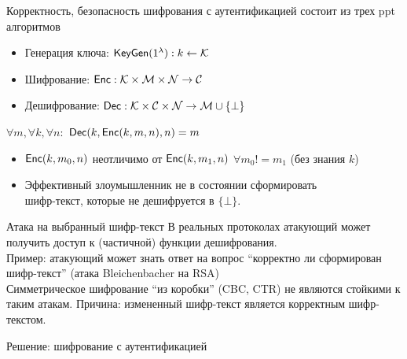 \documentclass[usenames,dvipsnames,8pt,aspectratio=169]{beamer}
\begin{document}
\begin{frame}{Корректность, безопасность шифрования с аутентификацией }
	\Large
	{\color{Orange}{Шифрование с аутентификацией (AE)}} состоит из трех ppt алгоритмов
	\begin{itemize}
		\itemsep 10pt
		\item Генерация ключа: $\textsf{KeyGen}(1^\lambda): k \leftarrow \mathcal{K}$
		\item Шифрование: $\textsf{Enc}: \mathcal{K} \times \mathcal{M} \times \mathcal{N} \rightarrow \mathcal{C}$
		\item Дешифрование:  $\textsf{Dec}: \mathcal{K} \times \mathcal{C}  \times \mathcal{N} \rightarrow \mathcal{M} \cup \{\bot\}$
	\end{itemize}
	
	\vspace{15pt}
	{\color{Orange}{Корректность:}} $\forall m, \forall k, \forall n:$ $\textsf{Dec}(k, \textsf{Enc}(k, m,n), n) = m$
	
	\vspace{15pt}
	{\color{Orange}{Безопасность (неформально):}}
	\begin{itemize}
		\itemsep 10pt
		\item $\textsf{Enc}(k, m_0, n)$ неотличимо от $\textsf{Enc}(k, m_1, n)$ $\forall m_0 != m_1$ (без знания $k$) 
		\item  Эффективный злоумышленник не в состоянии сформировать \\ шифр-текст, которые не дешифруется в $\{\bot\}$.
	\end{itemize}
	
\end{frame}

\begin{frame}{Атака на выбранный шифр-текст}
	\Large 
	В реальных протоколах атакующий может получить доступ к (частичной) функции {\color{Orange}  дешифрования}.  \\[10pt]
	
	Пример: атакующий может знать ответ на вопрос ``корректно ли сформирован шифр-текст'' (атака Bleichenbacher на RSA) \\[10pt]
	
	Симметрическое шифрование ``из коробки'' (CBC, CTR)  {\color{Orange}  не являются}  стойкими к таким атакам.  {\color{Orange} Причина:} измененный шифр-текст является  {\color{Orange}  корректным } шифр-текстом. \\[10pt]
	
	\centering
	
	{\color{Orange} Решение: } шифрование с аутентификацией
	
	
\end{frame}
\end{document}
